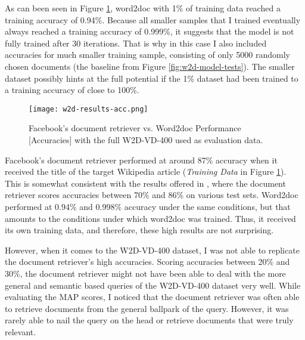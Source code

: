 As can been seen in Figure \ref{fig:w2d-results-acc}, word2doc with 1\% of training data reached a training accuracy of 0.94\%.
Because all smaller samples that I trained eventually always reached a training accuracy of 0.999\%, it suggests that the model
is not fully trained
after 30 iterations. That is why in this case I also included accuracies for much smaller training sample, consisting of only 5000
randomly chosen documents (the baseline from Figure \ref{fig:w2d-model-tests}). The smaller dataset possibly hints at the full
potential if the 1\% dataset had been trained to a training accuracy of close to 100\%.

\begin{figure}
  \begin{center}
    \texttt{[image: w2d-results-acc.png]}
  \end{center}
  \captionsetup{width=.75\linewidth}
  \caption{Facebook's document retriever vs. Word2doc Performance [Accuracies] with the full W2D-VD-400 used as evaluation data.}
  \label{fig:w2d-results-acc}
\end{figure}

Facebook's document retriever performed at around 87\% accuracy when it received the title of the target Wikipedia article
(\textit{Training Data} in Figure \ref{fig:w2d-results-acc}). This is somewhat consistent with the results offered
in \citet{drqa}, where the document retriever scores accuracies between 70\% and 86\% on various test sets. Word2doc performed at
0.94\% and 0.998\% accuracy under the same conditions, but that amounts to the conditions under which word2doc was trained.
Thus, it received its own training data, and therefore, these high results are not surprising.

However, when it comes to the W2D-VD-400 dataset, I was not able to replicate the document retriever's high accuracies. Scoring
accuracies between 20\% and 30\%, the document retriever might not have been able to deal with the more general and semantic based
queries of the W2D-VD-400 dataset very well. While evaluating the MAP scores, I noticed that the document retriever was often able
to retrieve documents from the general ballpark of the query. However, it was rarely able to nail the query on the head or retrieve
documents that were truly relevant.

